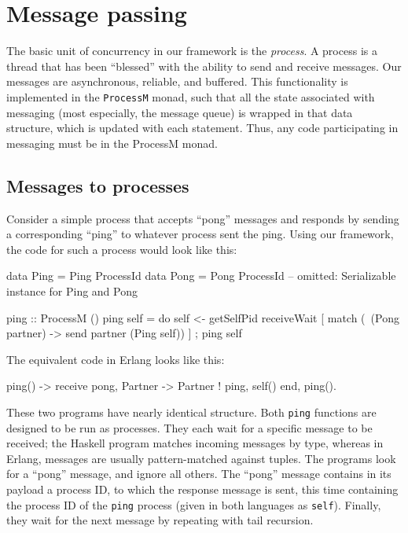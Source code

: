 \documentclass[preprint]{sigplanconf}
\begin{document}
\section{Message passing}

The basic unit of concurrency in our framework is the {\em process}. A process is a thread that has been ``blessed'' with the ability to send and receive messages. Our messages are asynchronous, reliable, and buffered. This functionality is implemented in the \texttt{ProcessM} monad, such that all the state associated with messaging (most especially, the message queue) is wrapped in that data structure, which is updated with each statement. Thus, any code participating in messaging must be in the ProcessM monad.

\subsection{Messages to processes}

Consider a simple process that accepts ``pong'' messages and responds by sending a corresponding ``ping'' to whatever process sent the ping. Using our framework, the code for such a process would look like this:

\begin{code}[caption={Ping in Haskell}]
data Ping = Ping ProcessId
data Pong = Pong ProcessId
-- omitted: Serializable instance for Ping and Pong

ping :: ProcessM ()
ping self = 
   do { self <- getSelfPid
        receiveWait [
          match (\ (Pong partner) -> 
            send partner (Ping self)) ]
      ; ping self }
\end{code}

The equivalent code in Erlang looks like this:

\begin{code}[language=Erlang,caption={Ping in Erlang}]
ping() ->
  receive
    {pong, Partner} -> 
      Partner ! {ping, self()}
  end,
  ping().               
\end{code}

These two programs have nearly identical structure. Both \texttt{ping} functions are designed to be run as processes. They each wait for a specific message to be received; the Haskell program matches incoming messages by type, whereas in Erlang, messages are usually pattern-matched against tuples. The programs look for a ``pong'' message, and ignore all others. The ``pong'' message contains in its payload a process ID, to which the response message is sent, this time containing the process ID of the \texttt{ping} process (given in both languages as \texttt{self}). Finally, they wait for the next message by repeating with tail recursion.
\end{document}
